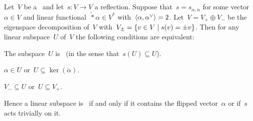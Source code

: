 \begin{lemma}
  \label{subspaces invariant under reflection}
  Let~$V$ be a~{\vectorspace{$\kf$}} and let~$s \colon V \to V$ a reflection.
  Suppose that~$s = s_{\alpha, \check{\alpha}}$ for some vector~$\alpha \in V$ and linear functional~$\check*{\alpha} \in V^*$ with~$\pair{\alpha, \check{\alpha}} = 2$.
  Let~$V = V_+ \oplus V_-$ be the eigenspace decomposition of~$V$ with~$V_{\pm} = \{v \in V \suchthat s(v) = \pm v\}$.
  Then for any linear subspace~$U$ of~$V$ the following conditions are equivalent:
  \begin{equivalenceslist}
    \item
      \label{is reflection invariant}
      The subspace~$U$  is~{} (in the sense that~$s(U) \subseteq U$).
    \item
      \label{contains alpha or is contained in kernel}
      $\alpha \in U$ or~$U \subseteq \ker(\check{\alpha})$.
    \item
      \label{contains minus or is contained in plus}
      $V_- \subseteq U$ or~$U \subseteq V_+$.
  \end{equivalenceslist}
  Hence a linear subspace is~{} if and only if it contains the flipped vector~$\alpha$ or if~$s$ acts trivially on it.
\end{lemma}



